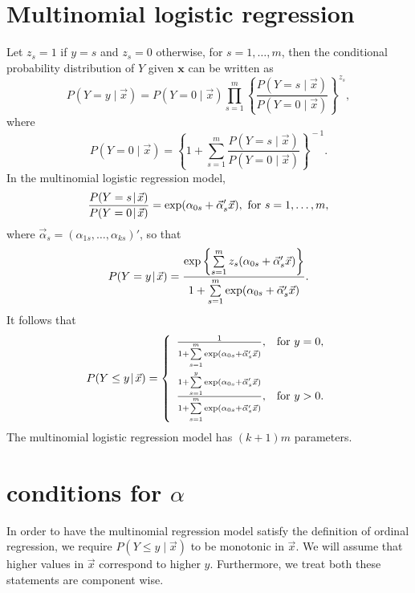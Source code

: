 \documentclass[12pt]{article}
\begin{document}
\section{Multinomial logistic regression}
Let $z_{s}=1$ if $y=s$ and $z_{s}=0$ otherwise, for $s=1,\ldots,m$, then the conditional probability distribution of $Y$ given $\mathbf{x}$ can be written as
\begin{equation}
	P(Y=y\!\mid\!\vec{x})=P(Y=0\!\mid\!\vec{x})\prod_{s=1}^{m}\!\left\{\frac{P(Y=s\!\mid\!\vec{x})}{P(Y=0\!\mid\!\vec{x})}\right\}^{\!z_{s}},
\end{equation}
where
\begin{equation}
	P(Y=0\!\mid\!\vec{x})=\left\{1+\sum_{s=1}^{m}\frac{P(Y=s\!\mid\!\vec{x})}{P(Y=0\!\mid\!\vec{x})}\right\}^{\!-1}.
\end{equation}
In the multinomial logistic regression model,
\begin{equation}
	\frac{P(Y=s\!\mid\!\vec{x})}{P(Y=0\!\mid\!\vec{x})}=\textup{exp}(\alpha_{0s}+\vec{\alpha}'_{s}\vec{x}),\ \textup{for $s=1,\ldots,m$},
\end{equation}
where $\vec{\alpha}_{s}=(\alpha_{1s},\ldots,\alpha_{ks})'$, so that
\begin{equation}
	P(Y=y\!\mid\!\vec{x})=\frac{\textup{exp}\left\{\sum\limits_{s=1}^{m}z_{s}(\alpha_{0s}+\vec{\alpha}'_{s}\vec{x})\right\}}{1+\sum\limits_{s=1}^{m}\textup{exp}(\alpha_{0s}+\vec{\alpha}'_{s}\vec{x})}.
\end{equation}
It follows that
\begin{equation}
	P(Y\leq y\!\mid\!\vec{x})=\left\{\begin{array}{ll}\frac{1}{1+\sum\limits_{s=1}^{m}\textup{exp}(\alpha_{0s}+\vec{\alpha}'_{s}\vec{x})},&\textup{for $y=0$},\\
		\rule{0cm}{1cm}\frac{1+\sum\limits_{s=1}^{y}\textup{exp}(\alpha_{0s}+\vec{\alpha}'_{s}\vec{x})}{1+\sum\limits_{s=1}^{m}\textup{exp}(\alpha_{0s}+\vec{\alpha}'_{s}\vec{x})},&\textup{for $y>0$}.
	\end{array}\right.
\end{equation}
The multinomial logistic regression model has $(k+1)m$ parameters.

\section{conditions for $\alpha$}
In order to have the multinomial regression model satisfy the definition of ordinal regression, we require $P(Y \leq y \!\mid\! \vec{x})$ to be monotonic in $\vec{x}$. We will assume that higher values in $\vec{x}$ correspond to higher $y$. Furthermore, we treat both these statements are component wise.
\end{document}
